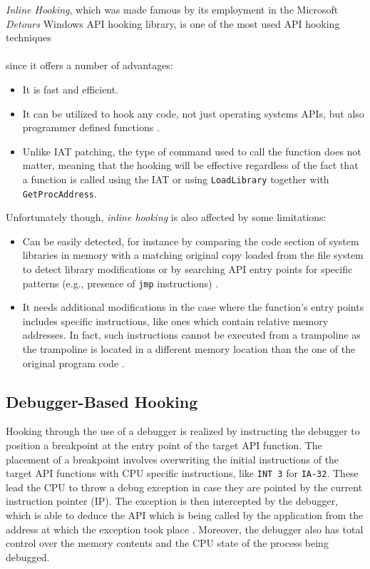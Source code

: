 \textit{Inline Hooking}, which was made famous by its employment  in the Microsoft \textit{Detours} Windows API hooking library, is one of the most used API hooking techniques
\\
\\
since it offers a number of advantages:
\begin{itemize}
\item It is fast and efficient.
\item It can be utilized to hook any code, not just operating systems APIs, but also programmer defined functions \cite{Rootkit}. 
\item Unlike IAT patching, the type of command used to call the function does not matter, meaning that the hooking will be effective regardless of the fact that a function is called using the IAT or using \texttt{LoadLibrary} together with \texttt{GetProcAddress}.
\end{itemize} 

Unfortunately though, \textit{inline hooking} is also affected by some limitations:

\begin{itemize}
\item Can be easily detected, for instance by comparing the code section of system libraries in memory with a matching original copy loaded from the file system to detect library modifications \cite{Buescher:2011:BIS:2186328.2186347} or by searching API entry points for specific patterns (e.g., presence of \texttt{jmp} instructions) \cite{HookingDetection}.
\item It needs additional modifications in the case where the function's entry points includes specific instructions, like ones which contain relative memory addresses. In fact, such instructions cannot be executed from a trampoline as the trampoline is located in a different memory location than the one of the original program code \cite{Berdajs:2010:EAU:1815744.1815746}.
\end{itemize}

\subsection{Debugger-Based Hooking} \label{Debugger}

Hooking through the use of a debugger is realized by instructing the debugger to position a breakpoint at the entry point of the target API function. The placement of a breakpoint involves overwriting the initial instructions of the target API functions with CPU specific instructions, like \texttt{INT 3} for \texttt{IA-32}. These lead the CPU to throw a debug exception in case they are pointed by the current instruction pointer (IP). The exception is then intercepted by the debugger, which is able to deduce the API which is being called by the application from the address at which the exception took place \cite{HookingDetection}. Moreover, the debugger also has total control over the memory contents and the CPU state of the process being debugged.

